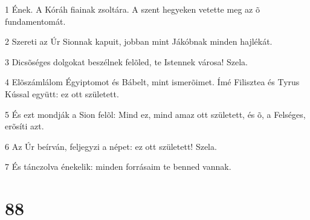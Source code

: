 \par 1 Ének. A Kóráh fiainak zsoltára. A szent hegyeken vetette meg az õ fundamentomát.
\par 2 Szereti az Úr Sionnak kapuit, jobban mint Jákóbnak minden hajlékát.
\par 3 Dicsõséges dolgokat beszélnek felõled, te Istennek városa! Szela.
\par 4 Elõszámlálom Égyiptomot és Bábelt, mint ismerõimet. Ímé Filisztea és Tyrus Kússal együtt: ez ott született.
\par 5 És ezt mondják a Sion felõl: Mind ez, mind amaz ott született, és õ, a Felséges, erõsíti azt.
\par 6 Az Úr beírván, feljegyzi a népet: ez ott született! Szela.
\par 7 És tánczolva énekelik: minden forrásaim te benned vannak.

\chapter{88}


